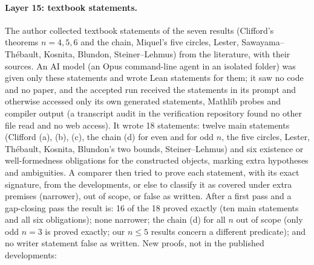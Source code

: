 \documentclass[11pt]{article}
\theoremstyle{definition}
\theoremstyle{remark}
\begin{document}
\paragraph{Layer 15: textbook statements.} The author collected textbook statements of the seven
results (Clifford's theorems $n=4,5,6$ and the chain, Miquel's five circles, Lester, Sawayama--Th\'ebault,
Kosnita, Blundon, Steiner--Lehmus) from the literature, with their sources. An AI model (an Opus
command-line agent in an isolated folder) was given only these statements and wrote Lean statements for
them; it saw no code and no paper, and the accepted run received the statements in its prompt and otherwise
accessed only its own generated statements, Mathlib probes and compiler output (a transcript audit
in the verification repository found no other file read and no web access). It wrote 18 statements: twelve main statements (Clifford (a), (b), (c), the chain (d) for even
and for odd $n$, the five circles, Lester, Th\'ebault, Kosnita, Blundon's two bounds, Steiner--Lehmus)
and six existence or well-formedness obligations for the constructed objects, marking extra hypotheses
and ambiguities. A comparer then tried to prove each statement, with its exact signature, from the
developments, or else to classify it as covered under extra premises (narrower), out of scope, or false
as written. After a first pass and a gap-closing pass the result is: 16 of the 18 proved exactly (ten
main statements and all six obligations); none narrower; the chain (d) for all $n$ out of scope (only odd
$n=3$ is proved exactly; our $n\le5$ results concern a different predicate); and no writer statement false
as written. New proofs, not in the published developments:
\end{document}
